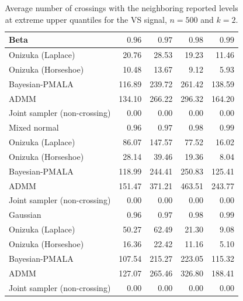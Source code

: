 \begin{table}[!htbp]
\centering
\small
\caption{Average number of crossings with the neighboring reported levels at extreme upper quantiles for the VS signal, $n=500$ and $k=2$.}
\label{tab:vs_ext_upper_cross_nb}
\begin{tabular}{lrrrr}
\toprule
Beta & $0.96$ & $0.97$ & $0.98$ & $0.99$ \\
\midrule
Onizuka (Laplace) & 20.76 & 28.53 & 19.23 & 11.46 \\
Onizuka (Horseshoe) & 10.48 & 13.67 & 9.12 & 5.93 \\
Bayesian-PMALA & 116.89 & 239.72 & 261.42 & 138.59 \\
ADMM & 134.10 & 266.22 & 296.32 & 164.20 \\
Joint sampler (non-crossing) & 0.00 & 0.00 & 0.00 & 0.00 \\
\midrule
Mixed normal & $0.96$ & $0.97$ & $0.98$ & $0.99$ \\
\midrule
Onizuka (Laplace) & 86.07 & 147.57 & 77.52 & 16.02 \\
Onizuka (Horseshoe) & 28.14 & 39.46 & 19.36 & 8.04 \\
Bayesian-PMALA & 118.99 & 244.41 & 250.83 & 125.41 \\
ADMM & 151.47 & 371.21 & 463.51 & 243.77 \\
Joint sampler (non-crossing) & 0.00 & 0.00 & 0.00 & 0.00 \\
\midrule
Gaussian & $0.96$ & $0.97$ & $0.98$ & $0.99$ \\
\midrule
Onizuka (Laplace) & 50.27 & 62.49 & 21.30 & 9.08 \\
Onizuka (Horseshoe) & 16.36 & 22.42 & 11.16 & 5.10 \\
Bayesian-PMALA & 107.54 & 215.27 & 223.05 & 115.32 \\
ADMM & 127.07 & 265.46 & 326.80 & 188.41 \\
Joint sampler (non-crossing) & 0.00 & 0.00 & 0.00 & 0.00 \\
\bottomrule
\end{tabular}
\end{table}
